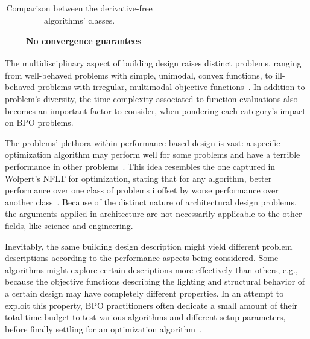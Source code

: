 \begin{table}[]
{\begin{tabular}{r|c|c|c|}
				\multicolumn{1}{|r|}{} &  & No convergence guarantees &  \\ \hline
			\end{tabular}%
		}
		\caption{Comparison between the derivative-free algorithms' classes.}
		\label{table:compare-dfo-algos}
	\end{table}
	
	The multidisciplinary aspect of building design raises distinct problems, ranging from well-behaved problems with simple, unimodal, convex functions, to ill-behaved problems with irregular, multimodal objective functions~\cite{Wortmann2017ADO}. In addition to problem's diversity, the time complexity associated to function evaluations also becomes an important factor to consider, when pondering each category's impact on \ac{BPO} problems.
	
	The problems' plethora within performance-based design is vast: a specific optimization algorithm may perform well for some problems and have a terrible performance in other problems~\cite{Wortmann2017GABESTCHOICE, Fang2017}. This idea resembles the one captured in Wolpert's \ac{NFLT} for optimization, stating that for any algorithm, better
	performance over one class of problems i offset by worse performance over another class~\cite{Wolpert1997NFLT}. Because of the distinct nature of architectural design problems, the arguments applied in architecture are not necessarily applicable to the other fields, like science and engineering. 
	
	Inevitably, the same building design description might yield different problem descriptions according to the performance aspects being considered. Some algorithms might explore certain descriptions more effectively than others, e.g., because the objective functions describing the lighting and structural behavior of a certain design may have completely different properties. In an attempt to exploit this property, \ac{BPO} practitioners often dedicate a small amount of their total time budget to test various algorithms and different setup parameters, before finally settling for an optimization algorithm~\cite{Hamdy2016}.	
	
